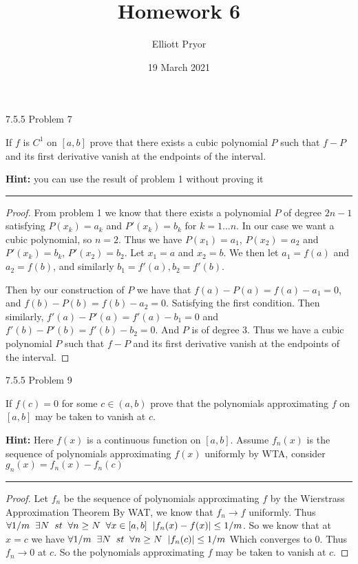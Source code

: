 \documentclass[11pt]{article}
\title{Homework 6}
\author{Elliott Pryor}
\date{19 March 2021}
\begin{document}
\maketitle

 7.5.5 Problem 7

If $f$ is $C^1$ on $[a,b]$ prove that there exists a cubic polynomial $P$
such that $f- P$ and its first derivative vanish at the endpoints of the interval.

\textbf{Hint: } you can use the result of problem 1 without proving it

\hrule

\begin{proof}
    
    From problem 1 we know that there exists a polynomial $P$ of degree $2n -1$ satisfying
    $P(x_k) = a_k$ and $P'(x_k) = b_k$ for $k = 1... n$. In our case we want a cubic polynomial,
    so $n = 2$. Thus we have $P(x_1) = a_1$, $P(x_2) = a_2$ and $P'(x_k) = b_k$, $P'(x_2) = b_2$.
    Let $x_1 = a$ and $x_2 = b$. We then let $a_1 = f(a)$ and $a_2 = f(b)$, and similarly $b_1 = f'(a), b_2 = f'(b)$.

    Then by our construction of $P$ we have that $f(a) - P(a) = f(a) - a_1 = 0$, and $f(b) - P(b) = f(b) - a_2 = 0$.
    Satisfying the first condition. Then similarly, $f'(a) - P'(a) = f'(a) - b_1 = 0$ and $f'(b) - P'(b) = f'(b) - b_2 = 0$.
    And $P$ is of degree 3. Thus we have a cubic polynomial $P$
    such that $f- P$ and its first derivative vanish at the endpoints of the interval.

\end{proof}



 7.5.5 Problem 9 

If $f(c) = 0$ for some $c \in (a,b)$ prove that the polynomials approximating $f$ on 
$[a,b]$ may be taken to vanish at $c$.

\textbf{Hint: } Here $f(x)$ is a continuous function on $[a,b]$.
Assume $f_n(x)$ is the sequence of polynomials approximating $f(x)$ uniformly by WTA,
consider $g_n(x) = f_n(x) - f_n(c)$

\hrule


\begin{proof}
    
    Let $f_n$ be the sequence of polynomials approximating $f$ by the Wierstrass Approximation Theorem
    By WAT, we know that $f_n \to f$ uniformly. Thus
    $\forall 1/m \sp \exists N \sp st \sp \forall n \geq N \sp \forall x \in [a,b] \sp |f_n(x) - f(x)| \leq 1/m$.
    So we know that at $x = c$ we have $\forall 1/m \sp \exists N \sp st \sp \forall n \geq N \sp |f_n(c)| \leq 1/m$
    Which converges to $0$. Thus $f_n \to 0$ at $c$. So the polynomials approximating $f$ may be 
    taken to vanish at $c$.

\end{proof}
\end{document}
